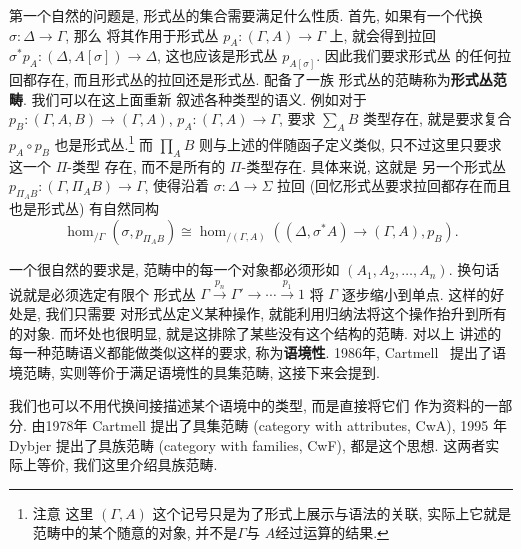 第一个自然的问题是, 形式丛的集合需要满足什么性质. 首先,
如果有一个代换 \(\sigma : \Delta \to \Gamma\), 那么
将其作用于形式丛 \(p_A : (\Gamma, A) \to \Gamma\) 上,
就会得到拉回 \(\sigma^* p_A : (\Delta, A[\sigma]) \to \Delta\),
这也应该是形式丛 \(p_{A[\sigma]}\). 因此我们要求形式丛
的任何拉回都存在, 而且形式丛的拉回还是形式丛. 配备了一族
形式丛的范畴称为\textbf{形式丛范畴}. 我们可以在这上面重新
叙述各种类型的语义. 例如对于 \(p_B : (\Gamma,A,B) \to (\Gamma,A)\),
\(p_A : (\Gamma,A) \to \Gamma\), 要求 \(\sum_A B\) 类型存在,
就是要求复合 \(p_A \circ p_B\) 也是形式丛.\footnote{注意
这里 \((\Gamma, A)\) 这个记号只是为了形式上展示与语法的关联,
实际上它就是范畴中的某个随意的对象, 并不是\(\Gamma\)与
\(A\)经过运算的结果.} 而 \(\prod_A B\)
则与上述的伴随函子定义类似, 只不过这里只要求这一个 \(\Pi\)-类型
存在, 而不是所有的 \(\Pi\)-类型存在. 具体来说, 这就是
另一个形式丛 \(p_{\Pi_AB} : (\Gamma, \Pi_A B) \to \Gamma\),
使得沿着 \(\sigma : \Delta \to \Sigma\) 拉回
(回忆形式丛要求拉回都存在而且也是形式丛) 有自然同构
\[\hom_{/\Gamma}(\sigma, p_{\Pi_AB})
\cong \hom_{/(\Gamma,A)}((\Delta, \sigma^*A) \to (\Gamma, A), p_B).\]

一个很自然的要求是, 范畴中的每一个对象都必须形如
\((A_1,A_2,\dots, A_n)\). 换句话说就是必须选定有限个
形式丛 \(\Gamma \xrightarrow{p_n} \Gamma' \to \cdots \xrightarrow{p_1} 1\)
将 \(\Gamma\) 逐步缩小到单点. 这样的好处是, 我们只需要
对形式丛定义某种操作, 就能利用归纳法将这个操作抬升到所有的对象.
而坏处也很明显, 就是这排除了某些没有这个结构的范畴. 对以上
讲述的每一种范畴语义都能做类似这样的要求, 称为\textbf{语境性}.
1986年, Cartmell~\cite{cartmell:1986:contextualcat}
提出了语境范畴, 实则等价于满足语境性的具集范畴, 这接下来会提到.


我们也可以不用代换间接描述某个语境中的类型, 而是直接将它们
作为资料的一部分. 由1978年 Cartmell 提出了具集范畴
(category with attributes, CwA), 1995 年 Dybjer
提出了具族范畴 (category with families, CwF),
都是这个思想. 这两者实际上等价, 我们这里介绍具族范畴.

